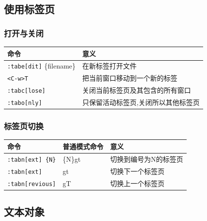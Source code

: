 \subsection{使用标签页}
\subsubsection{打开与关闭}
\begin{longtable}{ll}\hline\hline

	\textbf{命令} & \textbf{意义}\\

    \endhead

	\texttt{:tabe[dit]} \{filename\} & 在新标签打开文件 \\

	\texttt{<C-w>T} & 把当前窗口移动到一个新的标签 \\
	
	\texttt{:tabc[lose]} & 关闭当前标签页及其包含的所有窗口 \\

	\texttt{:tabo[nly]} & 只保留活动标签页,关闭所以其他标签页 \\

    \hline
\end{longtable} 

\subsubsection{标签页切换}
\begin{longtable}{lll}\hline\hline

	\textbf{命令} & \textbf{普通模式命令} & \textbf{意义}\\

    \endhead

	\texttt{:tabn[ext] \{N\}} & \{N\}gt & 切换到编号为N的标签页 \\

	\texttt{:tabn[ext]} & gt & 切换下一个标签页 \\
	
	\texttt{:tabn[revious]} & gT & 切换上一个标签页 \\

    \hline
\end{longtable} 

\subsection{文本对象}

